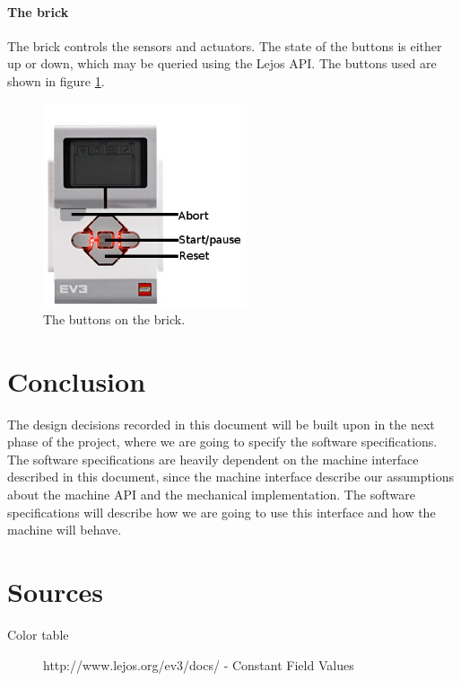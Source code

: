 \documentclass[a4paper,oneside,11pt]{article}
\begin{document}
\paragraph{The brick}
The brick controls the sensors and actuators. The state of the buttons is either up or down, which may be queried using the Lejos API. The buttons used are shown in figure \ref{brickbuttons}.
\begin{figure}[H]
	\centering
	\includegraphics[width=60mm]{BrickButtons}
	\caption{\label{brickbuttons}The buttons on the brick.}
\end{figure}

\section{Conclusion}
The design decisions recorded in this document will be built upon in the next phase of the project, where we are going to specify the software specifications. The software specifications are heavily dependent on the machine interface described in this document, since the machine interface describe our assumptions about the machine API and the mechanical implementation. The software specifications will describe how we are going to use this interface and how the machine will behave.

\newpage

\section{Sources}
\begin{description}
\item[Color table]  http://www.lejos.org/ev3/docs/ - Constant Field Values
\end{description}
\end{document}

